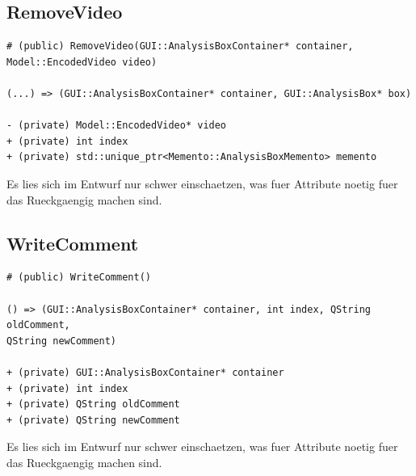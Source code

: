 \documentclass[parskip=full]{scrartcl}
\begin{document}
\subsection{RemoveVideo}
\begin{verbatim}
# (public) RemoveVideo(GUI::AnalysisBoxContainer* container, Model::EncodedVideo video)

(...) => (GUI::AnalysisBoxContainer* container, GUI::AnalysisBox* box)

- (private) Model::EncodedVideo* video
+ (private) int index
+ (private) std::unique_ptr<Memento::AnalysisBoxMemento> memento
\end{verbatim}
Es lies sich im Entwurf nur schwer einschaetzen, was fuer Attribute noetig fuer das Rueckgaengig machen sind.
\subsection{WriteComment}
\begin{verbatim}
# (public) WriteComment()

() => (GUI::AnalysisBoxContainer* container, int index, QString oldComment,
QString newComment)

+ (private) GUI::AnalysisBoxContainer* container
+ (private) int index
+ (private) QString oldComment
+ (private) QString newComment
\end{verbatim}
Es lies sich im Entwurf nur schwer einschaetzen, was fuer Attribute noetig fuer das Rueckgaengig machen sind.
\end{document}
